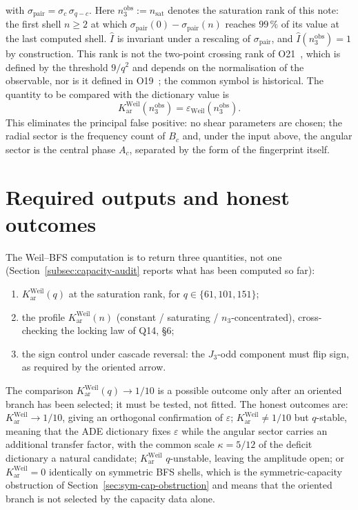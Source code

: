 \documentclass[11pt]{article}
\providecommand{\Ihat}{\widehat{I}}
\begin{document}
    with $\sigma_{\mathrm{pair}} = \sigma_c\, \sigma_{q-c}$.
    Here $n_3^{\mathrm{obs}} := n_{\mathrm{sat}}$ denotes the saturation rank of this note: the first shell
    $n \ge 2$ at which $\sigma_{\mathrm{pair}}(0) - \sigma_{\mathrm{pair}}(n)$ reaches $99\,\%$ of its value at
    the last computed shell.
    $\Ihat$ is invariant under a rescaling of $\sigma_{\mathrm{pair}}$, and $\Ihat(n_3^{\mathrm{obs}}) = 1$ by
    construction.
    This rank is not the two-point crossing rank of O21~\cite{Beau2026a25}, which is defined by the
    threshold $9/q^2$ and depends on the normalisation of the observable, nor is it defined in
    O19~\cite{Beau2026a23}; the common symbol is historical.
    The quantity
    to be compared with the dictionary value is
    \[
      K_{\mathrm{ar}}^{\mathrm{Weil}}(n_3^{\mathrm{obs}}) = \varepsilon_{\mathrm{Weil}}(n_3^{\mathrm{obs}}) .
    \]
    This eliminates the principal false positive: no shear parameters are chosen; the radial sector is the
    frequency count of $B_c$ and, under the input above, the angular sector is the central phase $A_c$, separated by the form of the
    fingerprint itself.

  \section{Required outputs and honest outcomes}

    The Weil--BFS computation is to return three quantities, not one (Section~\ref{subsec:capacity-audit} reports
    what has been computed so far):
    \begin{enumerate}
      \item $K_{\mathrm{ar}}^{\mathrm{Weil}}(q)$ at the saturation rank, for $q \in \{61, 101, 151\}$;
      \item the profile $K_{\mathrm{ar}}^{\mathrm{Weil}}(n)$ (constant / saturating / $n_3$-concentrated),
      cross-checking the locking law of Q14, \S6;
      \item the sign control under cascade reversal: the $J_3$-odd component must flip sign, as required by
      the oriented arrow.
    \end{enumerate}
    The comparison $K_{\mathrm{ar}}^{\mathrm{Weil}}(q) \to 1/10$ is a possible outcome only after an oriented
    branch has been selected; it must be tested, not fitted.
    The honest outcomes are: $K_{\mathrm{ar}}^{\mathrm{Weil}} \to 1/10$, giving an orthogonal confirmation of
    $\varepsilon$; $K_{\mathrm{ar}}^{\mathrm{Weil}} \neq 1/10$ but $q$-stable, meaning that the ADE dictionary
    fixes $\varepsilon$ while the angular sector carries an additional transfer factor, with the common scale
    $\kappa = 5/12$ of the deficit dictionary a natural candidate; $K_{\mathrm{ar}}^{\mathrm{Weil}}$
    $q$-unstable, leaving the amplitude open; or $K_{\mathrm{ar}}^{\mathrm{Weil}} = 0$ identically on symmetric
    BFS shells, which is the symmetric-capacity obstruction of Section~\ref{sec:sym-cap-obstruction} and means
    that the oriented branch is not selected by the capacity data alone.
\end{document}
